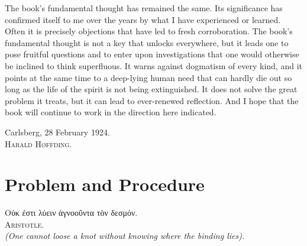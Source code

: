 \documentclass[12pt,a4paper]{book}
\newcommand{\opage}[1]{\marginnote{\footnotesize\textit{[#1]}}}
\begin{document}
The book's fundamental thought has remained the same. Its significance
has confirmed itself to me over the years by what I have experienced or
learned. Often it is precisely objections that have led to fresh
corroboration. The book's fundamental thought is not a key that unlocks
everywhere, but it leads one to pose fruitful questions and to enter
upon investigations that one would otherwise be inclined to think
superfluous. It warns against dogmatism of every kind, and it points at
the same time to a deep-lying human need that can hardly die out so long
as the life of the spirit is not being extinguished. It does not solve
the great problem it treats, but it can lead to ever-renewed reflection.
And I hope that the book will continue to work in the direction here
indicated.

\bigskip

\begin{flushright}
Carlsberg, 28 February 1924.\\
\textsc{Harald Høffding}.
\end{flushright}

\newpage

\chapter[Problem and Procedure]{Problem and Procedure\opage{1}}
\label{ch:problem}

\begin{flushright}
\opage{3}
Οὐκ ἐστι λύειν ἀγνοοῦντα τὸν δεσμόν.\\
\textsc{Aristotle}.\\[4pt]
\textit{(One cannot loose a knot without knowing where the binding lies).}
\end{flushright}

\bigskip
\end{document}
